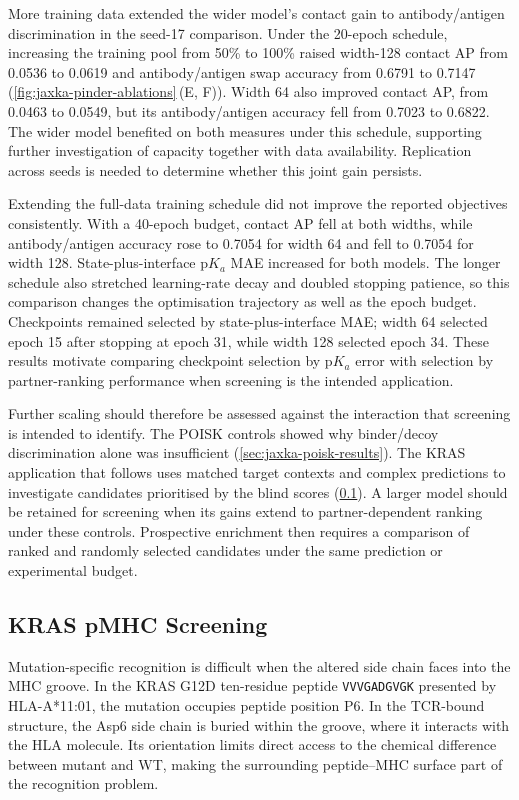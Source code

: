More training data extended the wider model's contact gain to antibody/antigen discrimination in the seed-17 comparison. Under the 20-epoch schedule, increasing the training pool from 50\% to 100\% raised width-128 contact AP from 0.0536 to 0.0619 and antibody/antigen swap accuracy from 0.6791 to 0.7147 (\cref{fig:jaxka-pinder-ablations}\,(E, F)). Width 64 also improved contact AP, from 0.0463 to 0.0549, but its antibody/antigen accuracy fell from 0.7023 to 0.6822. The wider model benefited on both measures under this schedule, supporting further investigation of capacity together with data availability. Replication across seeds is needed to determine whether this joint gain persists.

Extending the full-data training schedule did not improve the reported objectives consistently. With a 40-epoch budget, contact AP fell at both widths, while antibody/antigen accuracy rose to 0.7054 for width 64 and fell to 0.7054 for width 128. State-plus-interface $\mathrm{p}K_a$ MAE increased for both models. The longer schedule also stretched learning-rate decay and doubled stopping patience, so this comparison changes the optimisation trajectory as well as the epoch budget. Checkpoints remained selected by state-plus-interface MAE; width 64 selected epoch 15 after stopping at epoch 31, while width 128 selected epoch 34. These results motivate comparing checkpoint selection by $\mathrm{p}K_a$ error with selection by partner-ranking performance when screening is the intended application.

Further scaling should therefore be assessed against the interaction that screening is intended to identify. The POISK controls showed why binder/decoy discrimination alone was insufficient (\cref{sec:jaxka-poisk-results}). The KRAS application that follows uses matched target contexts and complex predictions to investigate candidates prioritised by the blind scores (\cref{sec:jaxka-kras-results}). A larger model should be retained for screening when its gains extend to partner-dependent ranking under these controls. Prospective enrichment then requires a comparison of ranked and randomly selected candidates under the same prediction or experimental budget.

\subsection{KRAS pMHC Screening}
\label{sec:jaxka-kras-results}

Mutation-specific recognition is difficult when the altered side chain faces into the MHC groove. In the KRAS G12D ten-residue peptide \texttt{VVVGADGVGK} presented by HLA-A*11:01, the mutation occupies peptide position P6. In the TCR-bound structure, the Asp6 side chain is buried within the groove, where it interacts with the HLA molecule.\supercite{pooleTherapeuticHighAffinity2022} Its orientation limits direct access to the chemical difference between mutant and WT, making the surrounding peptide--MHC surface part of the recognition problem.

